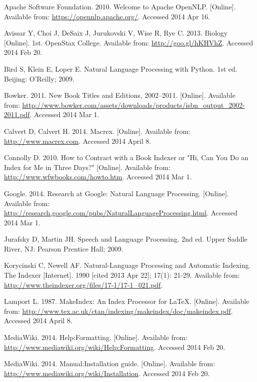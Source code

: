 \begin{thebibliography}{99}

Apache Software Foundation. 2010. Welcome to Apache OpenNLP. [Online]. Available from: \url{https://opennlp.apache.org/}. Accessed 2014 Apr 16.

Avissar Y, Choi J, DeSaix J, Jurukovski V, Wise R, Rye C. 2013. Biology [Online]. 1st. OpenStax College. Available from: \url{http://goo.gl/hKHVhZ}. Accessed 2014 Feb 20.

Bird S, Klein E, Loper E. Natural Language Processing with Python. 1st ed. Beijing: O'Reilly; 2009.

Bowker. 2011. New Book Titles and Editions, 2002--2011. [Online]. Available from: \url{http://www.bowker.com/assets/downloads/products/isbn_output_2002-2011.pdf}. Accessed 2014 Mar 1.

Calvert D, Calvert H. 2014. Macrex. [Online]. Available from: \url{http://www.macrex.com}. Accessed 2014 April 8.

Connolly D. 2010. How to Contract with a Book Indexer or "Hi, Can You Do an Index for Me in Three Days?" [Online]. Available from: \url{http://www.wfwbooks.com/howto.htm}. Accessed 2014 Mar 1.

Google. 2014. Research at Google: Natural Language Processing. [Online]. Available from: \url{http://research.google.com/pubs/NaturalLanguageProcessing.html}. Accessed 2014 Mar 1.

Jurafsky D, Martin JH. Speech and Language Processing. 2nd ed. Upper Saddle River, NJ: Pearson Prentice Hall; 2009.

Korycinski C, Newell AF. Natural-Language Processing and Automatic Indexing. The Indexer [Internet]. 1990 [cited 2013 Apr 22]; 17(1): 21-29. Available from: \url{http://www.theindexer.org/files/17-1/17-1_021.pdf}.

Lamport L. 1987. MakeIndex: An Index Processor for \LaTeX. [Online]. Available from: \url{http://www.tex.ac.uk/ctan/indexing/makeindex/doc/makeindex.pdf}. Accessed 2014 April 8.

MediaWiki. 2014. Help:Formatting. [Online]. Available from: \url{http://www.mediawiki.org/wiki/Help:Formatting}. Accessed 2014 Feb 20.

MediaWiki. 2014. Manual:Installation guide. [Online]. Available from: \url{http://www.mediawiki.org/wiki/Installation}. Accessed 2014 Feb 20.


\end{thebibliography}
